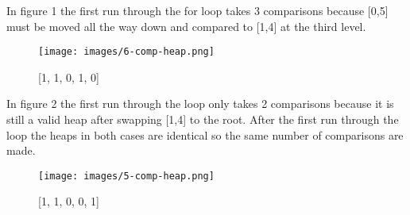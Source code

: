 \documentclass{article}
\begin{document}
In figure 1 the first run through the for loop takes 3 comparisons because [0,5] must be moved all the way down and compared to [1,4] at the third level.\\
\begin{figure}
\centering
\texttt{[image: images/6-comp-heap.png]}
\caption{[1, 1, 0, 1, 0] \label{overflow}}
\end{figure}
In figure 2 the first run through the loop only takes 2 comparisons because it is still a valid heap after swapping [1,4] to the root.  After the first run through the loop the heaps in both cases are identical so the same number of comparisons are made.
\begin{figure}
\centering
\texttt{[image: images/5-comp-heap.png]}
\caption{[1, 1, 0, 0, 1] \label{overflow}}
\end{figure}\\\\\\\\
\end{document}

